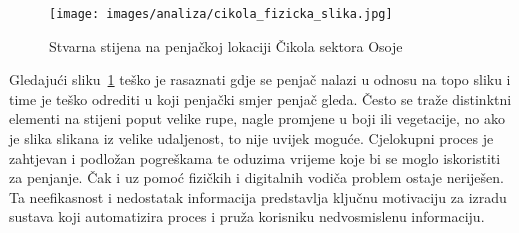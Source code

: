 \begin{figure}[H]
    \centering
    \texttt{[image: images/analiza/cikola\_fizicka\_slika.jpg]}
    \caption{Stvarna stijena na penjačkoj lokaciji Čikola sektora Osoje}
    \label{fig:cikola_fizicka_slika}
\end{figure} 

 Gledajući sliku~\ref{fig:cikola_fizicka_slika} teško je rasaznati gdje se penjač nalazi u odnosu na topo sliku i time je teško odrediti u koji penjački smjer penjač gleda. Često se traže distinktni elementi na stijeni poput velike rupe, nagle promjene u boji ili vegetacije, no ako je slika slikana iz velike udaljenost, to nije uvijek moguće. Cjelokupni proces je zahtjevan i podložan pogreškama te oduzima vrijeme koje bi se moglo iskoristiti za penjanje. Čak i uz pomoć fizičkih i digitalnih vodiča problem ostaje neriješen. Ta neefikasnost i nedostatak informacija predstavlja ključnu motivaciju za izradu sustava koji automatizira proces i pruža korisniku nedvosmislenu informaciju.